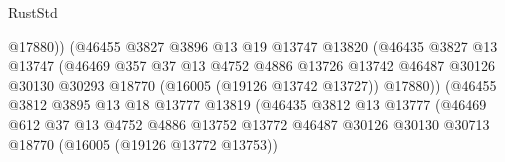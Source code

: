 \begin{lexlean}{RustStd}
\begin{coremodule}
                                          @17880))
                                      (@46455
                                        @3827
                                        @3896
                                        @13
                                        @19
                                        @13747
                                        @13820
                                        (@46435
                                          @3827
                                          @13
                                          @13747
                                          (@46469
                                            @357
                                            @37
                                            @13
                                            @4752
                                            @4886
                                            @13726
                                            @13742
                                            @46487
                                            @30126
                                            @30130
                                            @30293
                                            @18770
                                            (@16005 (@19126 @13742 @13727))
                                            @17880))
                                        (@46455
                                          @3812
                                          @3895
                                          @13
                                          @18
                                          @13777
                                          @13819
                                          (@46435
                                            @3812
                                            @13
                                            @13777
                                            (@46469
                                              @612
                                              @37
                                              @13
                                              @4752
                                              @4886
                                              @13752
                                              @13772
                                              @46487
                                              @30126
                                              @30130
                                              @30713
                                              @18770
                                              (@16005 (@19126 @13772 @13753))

\end{coremodule}
\end{lexlean}
